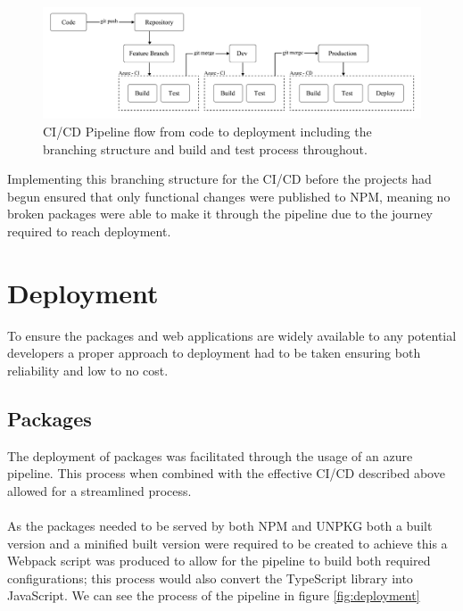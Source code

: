 \documentclass{l4proj}
\begin{document}
\begin{figure}[!ht]
    \begin{center}
        
    
    \includegraphics[width=14cm]{dissertation/images/CICD-structure.png}
    \end{center}
    \caption{CI/CD Pipeline flow from code to deployment including the branching structure and build and test process throughout.}
    \label{fig:CICDPipeline}
\end{figure}

Implementing this branching structure for the CI/CD before the projects had begun ensured that only functional changes were published to NPM, meaning no broken packages were able to make it through the pipeline due to the journey required to reach deployment.

\section{Deployment}
To ensure the packages and web applications are widely available to any potential developers a proper approach to deployment had to be taken ensuring both reliability and low to no cost.

\subsection{Packages}
The deployment of packages was facilitated through the usage of an azure pipeline. This process when combined with the effective CI/CD described above allowed for a streamlined process.
\\ \\
As the packages needed to be served by both NPM and UNPKG both a built version and a minified built version were required to be created to achieve this a Webpack script was produced to allow for the pipeline to build both required configurations; this process would also convert the TypeScript library into JavaScript. We can see the process of the pipeline in figure \ref{fig:deployment}
\end{document}
